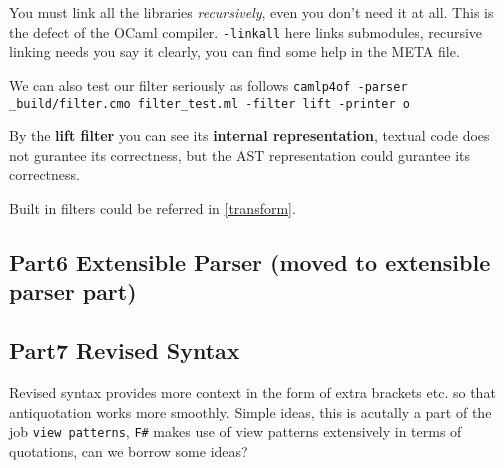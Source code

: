 You must link all the libraries \textit{recursively}, even you don't
need it at all. This is the defect of the OCaml compiler.
\verb|-linkall| here links submodules, recursive linking needs you say
it clearly,  you can find some  help in the META file.

We can also test our filter seriously as follows 
\verb|camlp4of -parser _build/filter.cmo filter_test.ml -filter lift -printer o |


By the \textbf{lift filter} you can see its \textbf{internal
  representation}, textual code does not gurantee its correctness, but
the AST representation could gurantee its correctness.


Built in filters could be referred in \ref{transform}.


\subsection{Part6 Extensible Parser (moved to extensible parser part)}

\subsection{Part7 Revised Syntax }
  Revised syntax provides more context in the form of extra brackets
  etc. so that antiquotation works more smoothly. Simple ideas, this
  is acutally a part of the job \verb|view patterns|, \verb|F#| makes
  use of view patterns extensively in terms of quotations, can we
  borrow some ideas?


